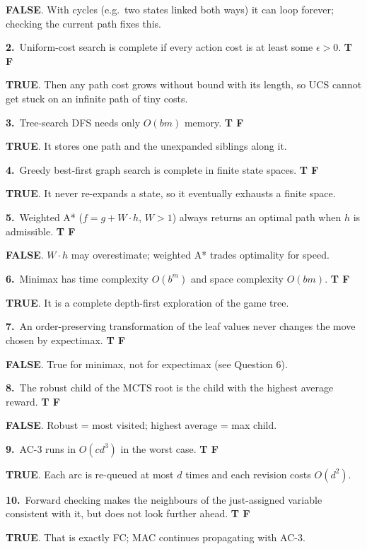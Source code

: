 \documentclass[11pt,a4paper]{article}
\newcommand{\subq}[1]{\par\smallskip\noindent\textbf{#1}\ }
\newcommand{\T}{\textbf{\textcolor{green!45!black}{TRUE}}}
\newcommand{\F}{\textbf{\textcolor{red!70!black}{FALSE}}}
\begin{document}
\begin{solbox}
\F. With cycles (e.g.\ two states linked both ways) it can loop forever; checking the current path fixes this.
\end{solbox}
\subq{2.}Uniform-cost search is complete if every action cost is at least some $\epsilon>0$. \hfill \textbf{T \quad F}
\begin{solbox}
\T. Then any path cost grows without bound with its length, so UCS cannot get stuck on an infinite path of tiny costs.
\end{solbox}
\subq{3.}Tree-search DFS needs only $O(bm)$ memory. \hfill \textbf{T \quad F}
\begin{solbox}
\T. It stores one path and the unexpanded siblings along it.
\end{solbox}
\subq{4.}Greedy best-first graph search is complete in finite state spaces. \hfill \textbf{T \quad F}
\begin{solbox}
\T. It never re-expands a state, so it eventually exhausts a finite space.
\end{solbox}
\subq{5.}Weighted A* ($f=g+W\cdot h$, $W>1$) always returns an optimal path when $h$ is admissible. \hfill \textbf{T \quad F}
\begin{solbox}
\F. $W\cdot h$ may overestimate; weighted A* trades optimality for speed.
\end{solbox}
\subq{6.}Minimax has time complexity $O(b^m)$ and space complexity $O(bm)$. \hfill \textbf{T \quad F}
\begin{solbox}
\T. It is a complete depth-first exploration of the game tree.
\end{solbox}
\subq{7.}An order-preserving transformation of the leaf values never changes the move chosen by expectimax. \hfill \textbf{T \quad F}
\begin{solbox}
\F. True for minimax, not for expectimax (see Question 6).
\end{solbox}
\subq{8.}The robust child of the MCTS root is the child with the highest average reward. \hfill \textbf{T \quad F}
\begin{solbox}
\F. Robust = most visited; highest average = max child.
\end{solbox}
\subq{9.}AC-3 runs in $O(cd^3)$ in the worst case. \hfill \textbf{T \quad F}
\begin{solbox}
\T. Each arc is re-queued at most $d$ times and each revision costs $O(d^2)$.
\end{solbox}
\subq{10.}Forward checking makes the neighbours of the just-assigned variable consistent with it, but does not look further ahead. \hfill \textbf{T \quad F}
\begin{solbox}
\T. That is exactly FC; MAC continues propagating with AC-3.
\end{solbox}
\end{document}
